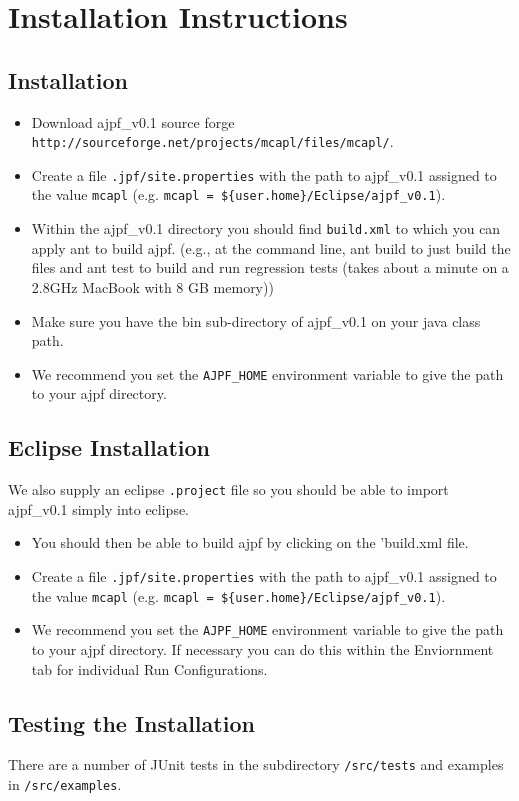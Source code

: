 \chapter{Installation Instructions}
\label{chap:installation}
\section{Installation}

\begin{itemize}
\item Download ajpf\_v0.1 source forge \texttt{http://sourceforge.net/projects/mcapl/files/mcapl/}.
\item Create a file \texttt{.jpf/site.properties} with the path to ajpf\_v0.1 assigned to the value \texttt{mcapl} (e.g. \texttt{mcapl = \$\{user.home\}/Eclipse/ajpf\_v0.1}).
\item Within the ajpf\_v0.1 directory you should find \texttt{build.xml} to which you can apply ant to build ajpf. (e.g., at the command line, ant build to just build the files and ant test to build and run regression tests (takes about a minute on a 2.8GHz MacBook with 8 GB memory))
\item Make sure you have the bin sub-directory of ajpf\_v0.1 on your java class path.
\item We recommend you set the \texttt{AJPF\_HOME} environment variable to give the path to your ajpf directory.
\end{itemize}

\section{Eclipse Installation}

We also supply an eclipse \texttt{.project} file so you should be able to import ajpf\_v0.1 simply into eclipse.
\begin{itemize}
\item You should then be able to build ajpf by clicking on the 'build.xml file.
\item Create a file \texttt{.jpf/site.properties} with the path to ajpf\_v0.1 assigned to the value \texttt{mcapl} (e.g. \texttt{mcapl = \$\{user.home\}/Eclipse/ajpf\_v0.1}).
\item We recommend you set the \texttt{AJPF\_HOME} environment variable to give the path to your ajpf directory.  If necessary you can do this within the Enviornment tab for individual Run Configurations.
\end{itemize}

\section{Testing the Installation}

There are a number of JUnit tests in the subdirectory \texttt{/src/tests} and examples in \texttt{/src/examples}.

